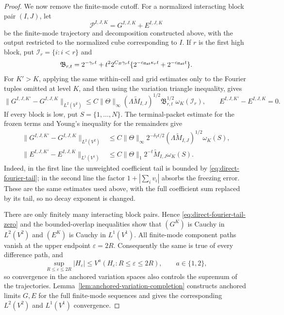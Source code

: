 \documentclass[11pt]{article}
\numberwithin{equation}{section}
\theoremstyle{remark}
\theoremstyle{definition}
\newcommand{\norm}[1]{\lVert #1\rVert}
\begin{document}
\begin{proof}
We now remove the finite-mode cutoff.  For a normalized interacting block
pair $(I,J)$, let
\[
 \mathcal P^{I,J,K}=G^{I,J,K}+E^{I,J,K}
\]
be the finite-mode trajectory and decomposition constructed above, with the
output restricted to the normalized cube corresponding to $I$.  If $r$ is
the first high block, put $\mathcal I_r=\{i:i<r\}$ and
\[
 \mathfrak B_{r,t}=2^{-\gamma_rt}
 +t^2 2^{C_B\gamma_rt}
   \{2^{-c_{\rm flat}\kappa_rt}+2^{-c_{\rm flat}t}\}.
\]
For $K'>K$, applying the same within-cell and grid estimates only to the
Fourier tuples omitted at level $K$, and then using the variation triangle
inequality, gives
\begin{equation}\label{eq:direct-high-fourier-cauchy}
 \norm{G^{I,J,K'}-G^{I,J,K}}_{L^2(V^2)}
 \le C\norm\Theta_\infty
       (\Lambda\widetilde M_{I,J})^{1/2}
       \mathfrak B_{r,t}^{1/2}\,\omega_K(\mathcal I_r),
 \qquad E^{I,J,K'}-E^{I,J,K}=0.
\end{equation}
If every block is low, put $S=\{1,\ldots,N\}$.  The terminal-packet
estimate for the frozen terms and Young's inequality for the remainders give
\begin{align}
 \norm{G^{I,J,K'}-G^{I,J,K}}_{L^2(V^2)}
 &\le C\norm\Theta_\infty 2^{-\delta_Tt/2}
       (\Lambda\widetilde M_{I,J})^{1/2}\omega_K(S),
 \label{eq:direct-low-good-fourier-cauchy}\\
 \norm{E^{I,J,K'}-E^{I,J,K}}_{L^1(V^1)}
 &\le C\norm\Theta_1 2^{-t}\widetilde M_{I,J}\omega_K(S).
 \label{eq:direct-low-error-fourier-cauchy}
\end{align}
Indeed, in the first line the unweighted coefficient tail is bounded by
\eqref{eq:direct-fourier-tail}; in the second line the factor
$1+|\sum_i v_i|$ absorbs the freezing error.  These are the same estimates
used above, with the full coefficient sum replaced by its tail, so no decay
exponent is changed.

There are only finitely many interacting block pairs.  Hence
\eqref{eq:direct-fourier-tail-zero} and the bounded-overlap inequalities show
that $(G^K)$ is Cauchy in $L^2(V^2)$ and $(E^K)$ is Cauchy in $L^1(V^1)$.
All finite-mode component paths vanish at the upper endpoint
$\varepsilon=2R$.  Consequently the same is true of every difference
path, and
\[
 \sup_{R\le\varepsilon\le2R}|H_\varepsilon|
 \le V^a(H_\varepsilon:R\le\varepsilon\le2R),
 \qquad a\in\{1,2\},
\]
so convergence in the anchored variation spaces also controls the
supremum of the trajectories.
Lemma~\ref{lem:anchored-variation-completion} constructs anchored limits
$G,E$ for the full finite-mode sequences and gives the corresponding
$L^2(V^2)$ and $L^1(V^1)$ convergence.


\end{proof}
\end{document}
